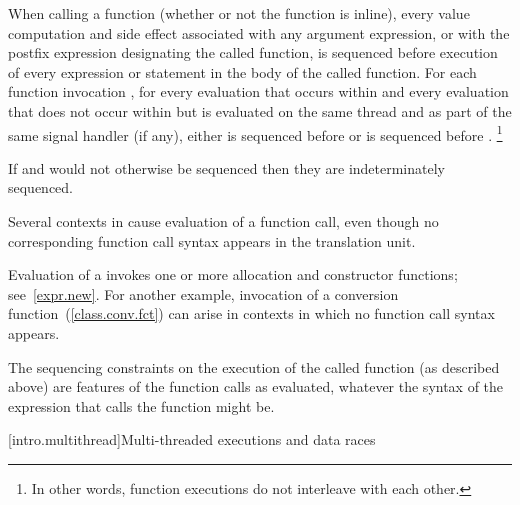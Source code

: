 \pnum
When calling a function (whether or not the function is inline), every
%
value computation and
%
side effect associated with any argument
expression, or with the postfix expression designating the called
function, is sequenced before execution of every expression or statement
in the body of the called function.
For each function invocation ,
for every evaluation  that occurs within  and
every evaluation  that does not occur within  but
is evaluated on the same thread and as part of the same signal handler (if any),
either  is sequenced before  or
 is sequenced before .
\footnote{In other words, function executions do not interleave with
each other.}
\begin{note}
If  and  would not otherwise be sequenced then they are
indeterminately sequenced.
\end{note}
Several contexts in \Cpp  cause evaluation of a function call, even
though no corresponding function call syntax appears in the translation
unit.
\begin{example}
Evaluation of a  invokes one or more allocation
and constructor functions; see~\ref{expr.new}. For another example,
invocation of a conversion function~(\ref{class.conv.fct}) can arise in
contexts in which no function call syntax appears.
\end{example}
The sequencing constraints on the execution of the called function (as
described above) are features of the function calls as evaluated,
whatever the syntax of the expression that calls the function might be.%
%

[intro.multithread]{Multi-threaded executions and data races}

